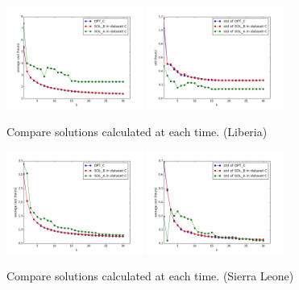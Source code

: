 \begin{figure}
    \centering
       \includegraphics[width=0.40\textwidth]{new_figs/ABC_average_L.png}
       \includegraphics[width=0.40\textwidth]{new_figs/ABC_std_L.png}
    \caption{Compare solutions calculated at each time. (Liberia)}
\label{fig:ABC_L}
\end{figure}

\begin{figure}
    \centering
       \includegraphics[width=0.40\textwidth]{new_figs/ABC_average_SL.png}
       \includegraphics[width=0.40\textwidth]{new_figs/ABC_std_SL.png}
    \caption{Compare solutions calculated at each time. (Sierra Leone)}
\label{fig:ABC}
\end{figure}

